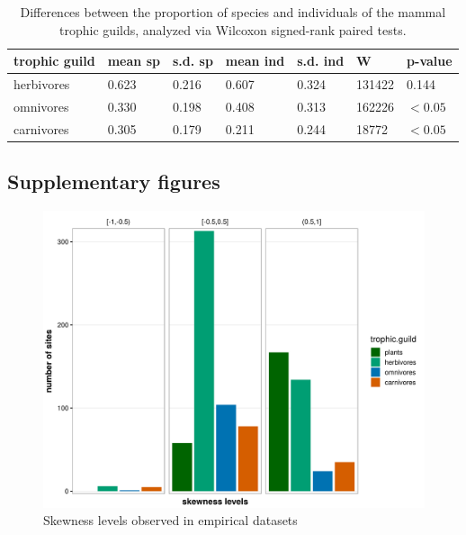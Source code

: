 \begin{table}[ht!]
\centering
\caption[Guild species/individuals]{\color{Gray}Differences between the proportion of species and individuals of the mammal trophic guilds, analyzed via Wilcoxon signed-rank paired tests.}\label{tab:tabApp4.1.6}
\begin{tabular}{lllllll}
\hline
  trophic guild  & mean sp &  s.d. sp & mean ind & s.d. ind & W & p-value \\
\hline
herbivores       &    0.623   &   0.216   &      0.607  &     0.324 &  131422 & 0.144 \\
omnivores        &    0.330   &   0.198   &      0.408  &     0.313 &  162226 & $<0.05$ \\
carnivores       &    0.305   &   0.179   &      0.211  &     0.244 &   18772 & $<0.05$ \\
\hline
\end{tabular}

\end{table}

\clearpage

\subsection*{Supplementary figures}

\begin{figure}[ht!]
\includegraphics[width=\textwidth,height=\textheight,keepaspectratio]{./Figures/Appendix4_1/Fig_5.png}
\caption[Observed skewness levels]{\color{Gray}Skewness levels observed in empirical datasets}\label{fig:figApp4.1.5}
\end{figure}
